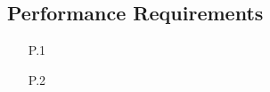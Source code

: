 \newpage
\subsection{Performance Requirements}

\begin{enumerate}
    \item[P.1]
    \item[P.2]
\end{enumerate}